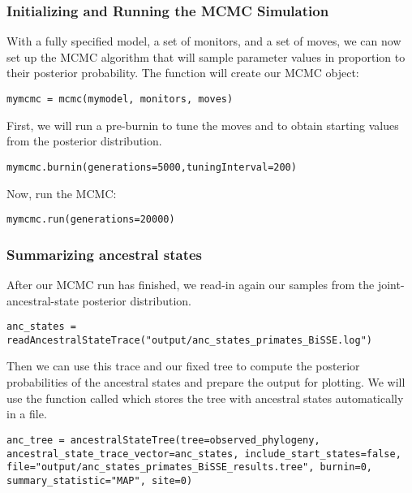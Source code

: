 \subsubsection{Initializing and Running the MCMC Simulation}

With a fully specified model, a set of monitors, and a set of moves, we can now set up the MCMC algorithm that will sample parameter values in proportion to their posterior probability. 
The  function will create our MCMC object:
{\tt \begin{snugshade*}
\begin{lstlisting}
mymcmc = mcmc(mymodel, monitors, moves)
\end{lstlisting}
\end{snugshade*}}

First, we will run a pre-burnin to tune the moves and to obtain starting values from the posterior distribution.
{\tt \begin{snugshade*}
\begin{lstlisting}
mymcmc.burnin(generations=5000,tuningInterval=200)
\end{lstlisting}
\end{snugshade*}}

Now, run the MCMC:
{\tt \begin{snugshade*}
\begin{lstlisting}
mymcmc.run(generations=20000)
\end{lstlisting}
\end{snugshade*}}


\subsubsection{Summarizing ancestral states}
After our MCMC run has finished, we read-in again our samples from the joint-ancestral-state posterior distribution.
{\tt \begin{snugshade*}
\begin{lstlisting}
anc_states = readAncestralStateTrace("output/anc_states_primates_BiSSE.log")
\end{lstlisting}
\end{snugshade*}}
Then we can use this trace and our fixed tree to compute the posterior probabilities of the ancestral states and prepare the output for plotting.
We will use the function called  which stores the tree with ancestral states automatically in a file.
{\tt \begin{snugshade*}
\begin{lstlisting}
anc_tree = ancestralStateTree(tree=observed_phylogeny, ancestral_state_trace_vector=anc_states, include_start_states=false, file="output/anc_states_primates_BiSSE_results.tree", burnin=0, summary_statistic="MAP", site=0)
\end{lstlisting}
\end{snugshade*}}


